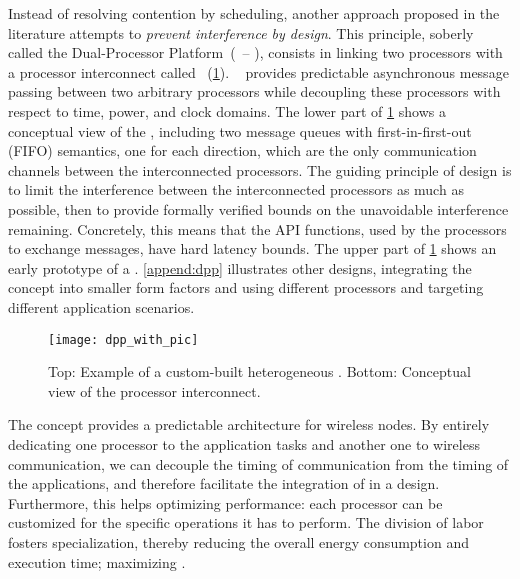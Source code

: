Instead of resolving contention by scheduling, another approach proposed in the literature attempts to \emph{prevent interference by design}. This principle, soberly called the Dual-Processor Platform~(\DPP~-- \cite{beutel2019DPPdemo}), consists in linking two processors with a processor interconnect called \bolt~(\cref{fig:dpp}).
\bolt~\cite{sutton2015Bolt} provides predictable asynchronous message passing between two arbitrary processors while decoupling these processors with respect to time, power, and clock domains.
The lower part of \cref{fig:dpp} shows a conceptual view of the \DPP, including two message queues with first-in-first-out (FIFO) semantics, one for each direction, which are the only communication channels between the interconnected processors.
The guiding principle of \bolt design is to limit the interference between the interconnected processors as much as possible, then to provide formally verified bounds on the unavoidable interference remaining.
Concretely, this means that the \bolt API functions, used by the processors to exchange messages, have hard latency bounds.
The upper part of \cref{fig:dpp} shows an early prototype of a \DPP.
\cref{append:dpp} illustrates other \DPP designs, integrating the concept into smaller form factors and using different processors and targeting different application scenarios.



\begin{figure}
  \centering
  \texttt{[image: dpp\_with\_pic]}
  \caption{
    Top: Example of a custom-built heterogeneous \DPP.
		\linebreak
		Bottom: Conceptual view of the \bolt processor interconnect.
		}
  \label{fig:dpp}
\end{figure}


The \DPP concept provides a predictable architecture for wireless \CPS nodes.
By entirely dedicating one processor to the application tasks and another one to wireless communication, we can decouple the timing of communication from the timing of the applications, and therefore facilitate the integration of \ST in a \CPS design.
Furthermore, this helps optimizing performance: each processor can be customized for the specific operations it has to perform. The division of labor fosters specialization, thereby reducing the overall energy consumption and execution time; \ie maximizing .

